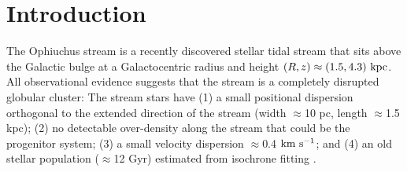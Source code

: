 %

\section{Introduction}\label{sec:ch5-introduction}

The Ophiuchus stream \citep{bernard14, sesar15a} is a recently discovered
stellar tidal stream that sits above the Galactic bulge at a Galactocentric
radius and height $(R,z) \approx (1.5, 4.3)~{\rm kpc}$. All observational
evidence suggests that the stream is a completely disrupted globular cluster:
The stream stars have (1) a small positional dispersion orthogonal to the
extended direction of the stream (width $\approx$10 pc, length $\approx$1.5
kpc); (2) no detectable over-density along the stream that could be the
progenitor system; (3) a small velocity dispersion $\approx$0.4 ${\rm km}~{\rm
s}^{-1}$; and (4) an old stellar population ($\approx$12 Gyr) estimated from
isochrone fitting \citep[][hereafter S15]{sesar15a}.

